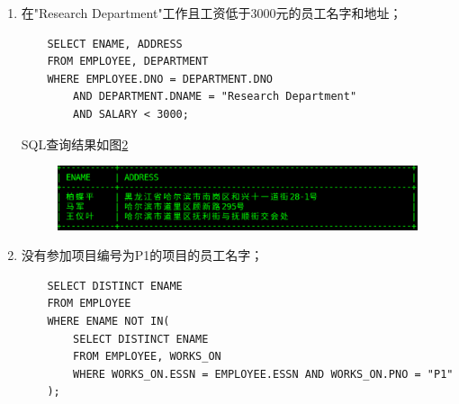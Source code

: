 \documentclass{ML}
\begin{document}
\begin{enumerate}
\begin{figure}[htb]
        \caption{}\label{fig:1}
    \end{figure}
    \item 在"Research Department"工作且工资低于3000元的员工名字和地址；
    \begin{verbatim}
    SELECT ENAME, ADDRESS
    FROM EMPLOYEE, DEPARTMENT
    WHERE EMPLOYEE.DNO = DEPARTMENT.DNO 
        AND DEPARTMENT.DNAME = "Research Department"
        AND SALARY < 3000;
    \end{verbatim}
    SQL查询结果如图\ref{fig:2}
    \begin{figure}[htb]
        \centering
        \includegraphics[scale=0.5, bb=0 0 815 146]{media/3.1.2.eps}
        \caption{}\label{fig:2}
    \end{figure}
    \item 没有参加项目编号为P1的项目的员工名字；
    \begin{verbatim}
    SELECT DISTINCT ENAME
    FROM EMPLOYEE
    WHERE ENAME NOT IN(
        SELECT DISTINCT ENAME
        FROM EMPLOYEE, WORKS_ON
        WHERE WORKS_ON.ESSN = EMPLOYEE.ESSN AND WORKS_ON.PNO = "P1"
    );
    \end{verbatim}


\end{enumerate}
\end{document}
